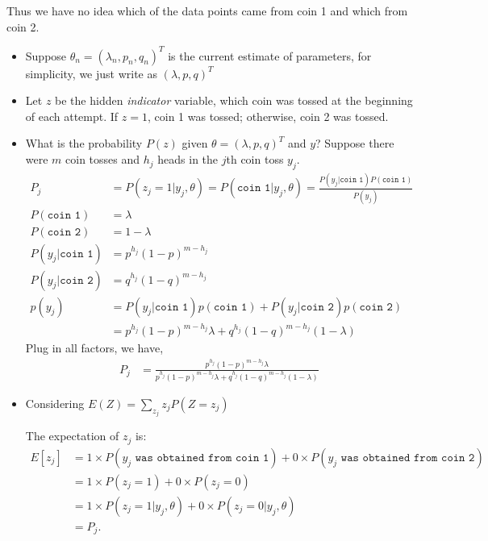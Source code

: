 \documentclass{article}  %
\begin{document}
Thus we have no idea which of the data points came from coin 1 and which from coin 2. 
\begin{itemize}
\item Suppose $\theta_n = (\lambda_n, p_n, q_n)^T$ is the current estimate of
parameters, for simplicity, we just write as $(\lambda, p, q)^T$
\item Let $z$ be the hidden \emph{indicator} variable, which coin was tossed at the beginning of each attempt. If $z=1$, coin 1 was tossed; otherwise, coin 2 was tossed. 
\item What is the probability $P(z)$ given $\theta = (\lambda, p, q)^T$ and $y$?
Suppose there were $m$ coin tosses and $h_j$ heads in the $j$th coin toss $y_j$. 
\begin{align*}
P_j &= P(z_j=1|y_j,\theta)= P(\texttt{coin 1}|y_j,\theta) =
\frac{P(y_j|\texttt{coin 1}) P(\texttt{coin 1})}{P(y_j)}\\
P(\texttt {coin 1}) &= \lambda\\
P(\texttt {coin 2}) &= 1-\lambda\\
P(y_j|\texttt{coin 1}) &= p ^ {h_j} (1-p)^{m-h_j}\\
P(y_j|\texttt{coin 2}) &= q ^ {h_j} (1-q)^{m-h_j}\\
p(y_j) &= P(y_j|\texttt{coin 1}) p(\texttt{coin 1}) + P(y_j|\texttt{coin 2})
p(\texttt{coin 2})\\
            &=   p ^ {h_j} (1- p)^{m-h_j}  \lambda + q ^ {h_j} (1- q)^{m-h_j}
            (1- \lambda)
\end{align*}
Plug in all factors, we have,
\begin{align*}
P_j &= \frac{ p ^ {h_j} (1- p)^{m-h_j}  \lambda}{ p ^ {h_j} (1- p)^{m-h_j} 
\lambda +  q ^ {h_j} (1- q)^{m-h_j} (1-\lambda)}
\end{align*}

\item Considering $E(Z) = \sum_{z_j} z_j P(Z=z_j)$

The expectation of $z_j$ is: 
\begin{align*}
E[z_j] &= 1 \times P(y_j \texttt{ was obtained from coin 1}) + 0 \times P(y_j
\texttt{ was obtained from coin 2})\\
&= 1 \times P(z_j=1) + 0 \times P(z_j=0)\\
&= 1 \times P(z_j=1|y_j,\theta) + 0 \times P(z_j=0|y_j,\theta)\\
&= P_j.
\end{align*}



\end{itemize}
\end{document}
